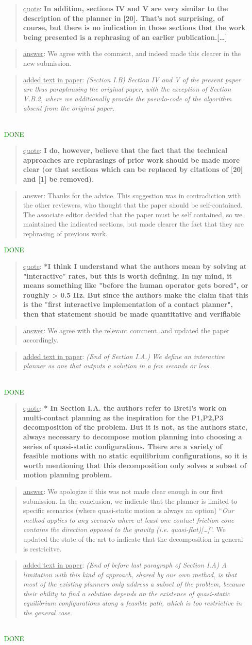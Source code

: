 \documentclass[a4paper]{article}
\newcommand{\done}[0]{\textcolor{green}{DONE}}
\newcommand\quot[1]{\begin{quote} \underline{quote}: \textbf{#1}\end{quote}}
\newcommand\as[1]{\begin{quote} \underline{answer}: {#1}\end{quote} }
\newcommand\qt[1]{\begin{quote} \underline{added text in paper}: \textit{#1}\end{quote} \leavevmode \\ }
\begin{document}
\quot{In addition, sections IV and V are very similar to the description of
the planner in [20]. That's not surprising, of course, but there is no
indication in those sections that the work being presented is a
rephrasing of an earlier publication.[\dots] }
\as{We agree with the comment, and indeed made this clearer in the new submission.}
\qt{(Section I.B) Section IV and V of the present paper are thus paraphrasing the original paper, with the exception of Section V.B.2, where we additionally provide the pseudo-code of the algorithm absent from the original paper.}\done

\quot{I do, however,
believe that the fact that the technical approaches are rephrasings of
prior work should be made more clear (or that sections which can be
replaced by citations of [20] and [1] be removed).}
\as{Thanks for the advice. This suggestion was in contradiction with the other reviewers, who thought that the paper should be self-contained.
The associate editor decided that the paper must be self contained, so we maintained the indicated sections, but made clearer the fact that they are rephrasing of previous work. }\done

\quot{*I think I understand what the authors mean by solving at
"interactive" rates, but this is worth defining. In my mind, it means
something like "before the human operator gets bored", or roughly > 0.5
Hz. But since the authors make the claim that this is the "first
interactive implementation of a contact planner", then that statement
should be made quantitative and verifiable}
\as{We agree with the relevant comment, and updated the paper accordingly.}
\qt{(End of Section I.A.) We define an interactive planner as one that outputs a solution in a few seconds or less.}\done

\quot{* In Section I.A. the authors refer to Bretl's work on multi-contact
planning as the inspiration for the P1,P2,P3 decomposition of the
problem. But it is not, as the authors state, always necessary to
decompose motion planning into choosing a series of quasi-static
configurations. There are a variety of feasible motions with no static
equilibrium configurations, so it is worth mentioning that this
decomposition only solves a subset of motion planning problem.}
\as{We apologize if this was not made clear enough in our first submission. In the conclusion, we indicate that the planner is limited to specific scenarios (where quasi-static motion
is always an option) ``\textit{Our method applies to any scenario where at least one
contact friction cone contains the direction opposed to the
gravity (i.e. quasi-flat)[\dots]}''. We updated the state of the art to indicate that the decomposition in general is restricitve.}
\qt{(End of before last paragraph of Section I.A) A limitation with
this kind of approach, shared by our own method, is that most of the existing planners only address a subset of the problem, because their ability to find a solution depends
on the existence of quasi-static equilibrium configurations along a feasible path, which is too restrictive in the general case.}\done
\end{document}
